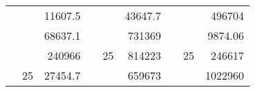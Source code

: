 \begin{table}[H]
\begin{tabular}{|ccrccrccc}
\rowcolor[HTML]{DAE8FC} 
\multicolumn{1}{|c|}{\cellcolor[HTML]{FFFFC7}}                                & \multicolumn{1}{c|}{\cellcolor[HTML]{DAE8FC}}                      & \multicolumn{1}{r|}{\cellcolor[HTML]{DAE8FC}11607.5}   & \multicolumn{1}{c|}{\cellcolor[HTML]{FFFFC7}}                                & \multicolumn{1}{c|}{\cellcolor[HTML]{DAE8FC}}                       & \multicolumn{1}{r|}{\cellcolor[HTML]{DAE8FC}43647.7}   & \multicolumn{1}{c|}{\cellcolor[HTML]{FFFFC7}}                                & \multicolumn{1}{c|}{\cellcolor[HTML]{DAE8FC}}                      & \multicolumn{1}{r|}{\cellcolor[HTML]{DAE8FC}496704}    \\ \cline{3-3} \cline{6-6} \cline{9-9} 
\multicolumn{1}{|c|}{\cellcolor[HTML]{FFFFC7}}                                & \multicolumn{1}{c|}{\cellcolor[HTML]{DAE8FC}}                      & \multicolumn{1}{r|}{\cellcolor[HTML]{DDFDFF}68637.1}   & \multicolumn{1}{c|}{\cellcolor[HTML]{FFFFC7}}                                & \multicolumn{1}{c|}{\cellcolor[HTML]{DAE8FC}}                       & \multicolumn{1}{r|}{\cellcolor[HTML]{DDFDFF}731369}    & \multicolumn{1}{c|}{\cellcolor[HTML]{FFFFC7}}                                & \multicolumn{1}{c|}{\cellcolor[HTML]{DAE8FC}}                      & \multicolumn{1}{r|}{\cellcolor[HTML]{DDFDFF}9874.06}   \\ \cline{3-3} \cline{6-6} \cline{9-9} 
\rowcolor[HTML]{DAE8FC} 
\multicolumn{1}{|c|}{\cellcolor[HTML]{FFFFC7}}                                & \multicolumn{1}{c|}{\cellcolor[HTML]{DAE8FC}}                      & \multicolumn{1}{r|}{\cellcolor[HTML]{DAE8FC}240966}    & \multicolumn{1}{c|}{\cellcolor[HTML]{FFFFC7}}                                & \multicolumn{1}{c|}{\multirow{-9}{*}{\cellcolor[HTML]{DAE8FC}25}}   & \multicolumn{1}{r|}{\cellcolor[HTML]{DAE8FC}814223}    & \multicolumn{1}{c|}{\cellcolor[HTML]{FFFFC7}}                                & \multicolumn{1}{c|}{\multirow{-9}{*}{\cellcolor[HTML]{DAE8FC}25}}  & \multicolumn{1}{r|}{\cellcolor[HTML]{DAE8FC}246617}    \\ \cline{3-3} \cline{5-6} \cline{8-9} 
\multicolumn{1}{|c|}{\cellcolor[HTML]{FFFFC7}}                                & \multicolumn{1}{c|}{\multirow{-10}{*}{\cellcolor[HTML]{DAE8FC}25}} & \multicolumn{1}{r|}{\cellcolor[HTML]{DDFDFF}27454.7}   & \multicolumn{1}{c|}{\cellcolor[HTML]{FFFFC7}}                                & \multicolumn{1}{c|}{\cellcolor[HTML]{DDFDFF}}                       & \multicolumn{1}{r|}{\cellcolor[HTML]{DAE8FC}659673}    & \multicolumn{1}{c|}{\cellcolor[HTML]{FFFFC7}}                                & \multicolumn{1}{c|}{\cellcolor[HTML]{DDFDFF}}                      & \multicolumn{1}{r|}{\cellcolor[HTML]{DAE8FC}1022960}   \\ \cline{2-3} \cline{6-6} \cline{9-9} 

\end{tabular}
\end{table}
